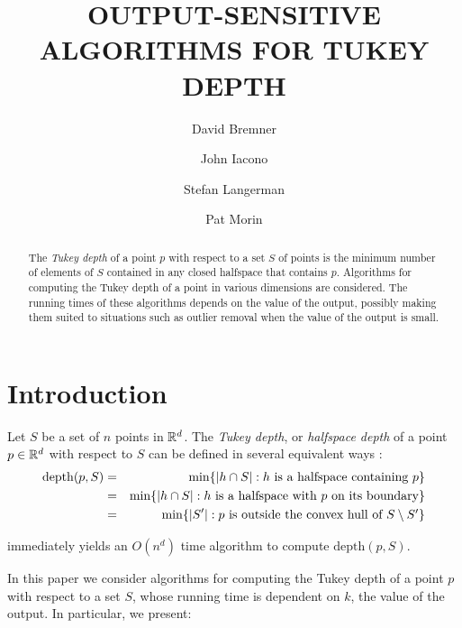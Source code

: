 \documentclass[charterfonts,lotsofwhite]{patmorin}
\title{\MakeUppercase{Output-Sensitive Algorithms for Tukey Depth}}
\author{David Bremner \and
	John Iacono \and
	Stefan Langerman \and
	Pat Morin}
\date{}
\newcommand{\td}{\mathrm{depth}}
\begin{document}
\maketitle

\begin{abstract}
The \emph{Tukey depth} of a point $p$ with respect to a set $S$ of
points is the minimum number of elements of $S$ contained in any
closed halfspace that contains $p$.  Algorithms for computing the
Tukey depth of a point in various dimensions are considered.  The
running times of these algorithms depends on the value of the output,
possibly making them suited to situations such as outlier removal when
the value of the output is small.
\end{abstract}

\section{Introduction}

Let $S$ be a set of $n$ points in $\mathbb{R}^d$.
The \emph{Tukey depth}, or \emph{halfspace depth} of a point $p\in\mathbb{R}^d$ with
respect to $S$ can be defined in several equivalent ways \cite{t73}:
\begin{eqnarray}
\td(p,S) & = & \min\{ |h\cap S| :
	             \mbox{$h$ is a halfspace containing $p$} \} \\ 
                     \eqlabel{tuk-orig}
            & = & \min\{ |h\cap S| :
                      \mbox{$h$ is a halfspace with $p$ on its boundary} \} \\ 
                       \eqlabel{tuk-boundary}
            & = & \min\{ |S'| :
                      \mbox{$p$ is outside the convex hull of 
                           $S\setminus S'$} \}
                      \eqlabel{tuk-hull}
\end{eqnarray}

 immediately yields an $O(n^{d})$ time algorithm
to compute $\td(p,S)$.

In this paper we consider algorithms for computing the Tukey depth of
a point $p$ with respect to a set $S$, whose running time is dependent
on $k$, the value of the output. In particular, we present:
\end{document}
